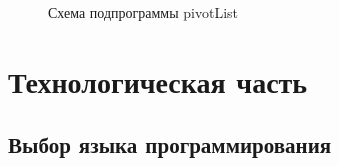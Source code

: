 \documentclass[a4paper,14pt]{report}
\begin{document}
\begin{figure}
\caption{Схема подпрограммы pivotList}
\label{fig:image}
\end{figure}


\chapter*{Технологическая часть}

\section*{Выбор языка программирования}
\end{document}
